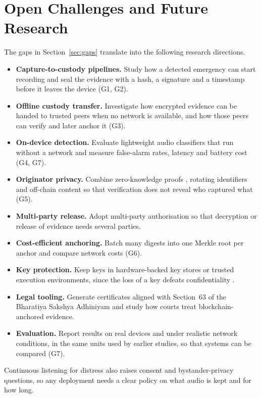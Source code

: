 \documentclass[conference,a4paper,10pt]{IEEEtran}
\begin{document}
\section{Open Challenges and Future Research}\label{sec:future}
The gaps in Section~\ref{sec:gaps} translate into the following research directions.
\begin{itemize}
  \item \textbf{Capture-to-custody pipelines.} Study how a detected emergency can start recording and seal the evidence with a hash, a signature and a timestamp before it leaves the device (G1, G2).
  \item \textbf{Offline custody transfer.} Investigate how encrypted evidence can be handed to trusted peers when no network is available, and how those peers can verify and later anchor it (G3).
  \item \textbf{On-device detection.} Evaluate lightweight audio classifiers that run without a network and measure false-alarm rates, latency and battery cost (G4, G7).
  \item \textbf{Originator privacy.} Combine zero-knowledge proofs \cite{lavin}, rotating identifiers and off-chain content so that verification does not reveal who captured what (G5).
  \item \textbf{Multi-party release.} Adopt multi-party authorisation \cite{park} so that decryption or release of evidence needs several parties.
  \item \textbf{Cost-efficient anchoring.} Batch many digests into one Merkle root per anchor \cite{jaquet} and compare network costs \cite{ratul} (G6).
  \item \textbf{Key protection.} Keep keys in hardware-backed key stores or trusted execution environments, since the loss of a key defeats confidentiality \cite{saif}.
  \item \textbf{Legal tooling.} Generate certificates aligned with Section~63 of the Bharatiya Sakshya Adhiniyam \cite{bsa} and study how courts treat blockchain-anchored evidence.
  \item \textbf{Evaluation.} Report results on real devices and under realistic network conditions, in the same units used by earlier studies, so that systems can be compared (G7).
\end{itemize}
Continuous listening for distress also raises consent and bystander-privacy questions, so any deployment needs a clear policy on what audio is kept and for how long.
\end{document}
